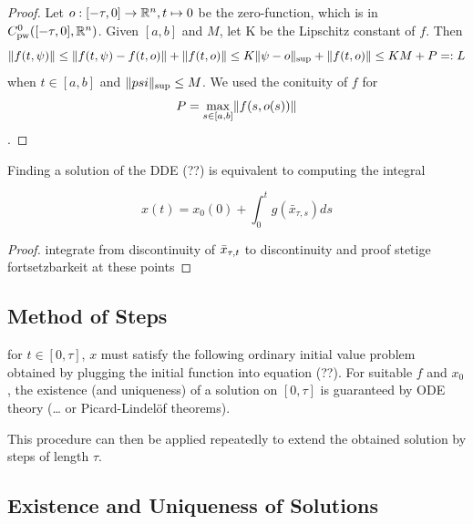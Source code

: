 \documentclass[10pt]{article}
\begin{document}
\begin{proof}
    Let $o:[-\tau,0]\rightarrow\mathbb{R}^n, t\mapsto 0$ be the zero-function, which is in $C^0_\text{pw}([-\tau,0],\mathbb{R}^n)$.
    Given $[a,b]$ and $M$, let K be the Lipschitz constant of $f$. Then
    \begin{equation}
        \lVert f(t,\psi)\rVert \leq \lVert f(t,\psi) - f(t,o)\rVert + \lVert f(t,o)\rVert \leq K\lVert\psi-o\rVert_{\text{\scriptsize{sup}}} + \lVert f(t,o)\rVert \leq KM+P =: L
    \end{equation}
    when $t\in[a,b]$ and $\lVert psi\rVert_{\text{\scriptsize{sup}}}\leq M$. We used the conituity of $f$ for
    \begin{equation}
        P = \max_{s\in [a,b]}\lVert f(s,o(s))\rVert
    \end{equation}.
\end{proof}

\begin{lemma}
    \label{lemma-integral-equation}


    Finding a solution of the DDE (??) is equivalent to computing the integral

    \begin{equation}
        x(t) = x_0(0) + \int_0^t g(\bar{x}_{\tau,s})ds
    \end{equation}

\end{lemma}

\begin{proof}
integrate from discontinuity of $\bar{x}_{\tau,t}$ to discontinuity and proof stetige fortsetzbarkeit at these points
\end{proof}

\subsection{Method of Steps} \label{sec:method-of-steps}
for $t\in [0,\tau]$, $x$ must satisfy the following ordinary initial value problem obtained by plugging the initial function into equation (??). For suitable $f$ and $x_0$, the existence (and uniqueness) of a solution on $[0,\tau]$ is guaranteed by ODE theory (\ldots{} or Picard-Lindelöf theorems).

This procedure can then be applied repeatedly to extend the obtained solution by steps of length $\tau$.

\subsection{Existence and Uniqueness of Solutions} \label{existence-and-uniqueness-of-solutions}
\end{document}
